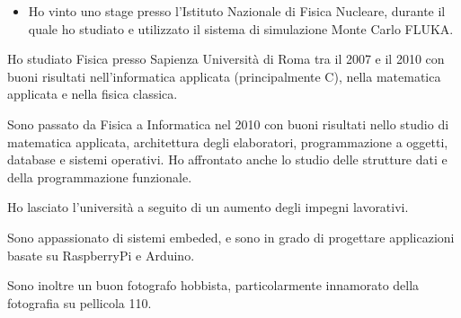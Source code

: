 \documentclass[10pt,a4paper]{altacv}
\begin{document}

\begin{itemize}
\item Ho vinto uno stage presso l'Istituto Nazionale di Fisica Nucleare, durante il quale ho studiato e utilizzato il sistema di simulazione Monte Carlo FLUKA.
\end{itemize}

Ho studiato Fisica presso Sapienza Università di Roma tra il 2007 e il 2010 con buoni risultati nell'informatica applicata (principalmente C), nella matematica applicata e nella fisica classica.

\smallskip

Sono passato da Fisica a Informatica nel 2010 con buoni risultati nello studio di matematica applicata, architettura degli elaboratori, programmazione a oggetti, database e sistemi operativi. Ho affrontato anche lo studio delle strutture dati e della programmazione funzionale.

\smallskip

Ho lasciato l'università a seguito di un aumento degli impegni lavorativi.

Sono appassionato di sistemi embeded, e sono in grado di progettare applicazioni basate su RaspberryPi e Arduino.

\smallskip

Sono inoltre un buon fotografo hobbista, particolarmente innamorato della fotografia su pellicola 110.
\end{document}
